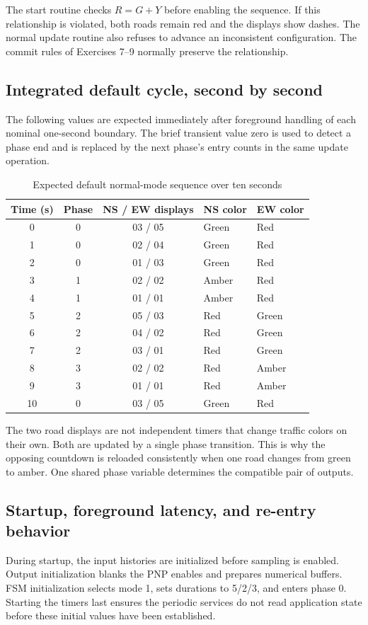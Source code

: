 \documentclass[a4paper]{article}
\newcommand{\topic}[1]{\subsection{#1}}
\begin{document}
The start routine checks \(R=G+Y\) before enabling the sequence. If this
relationship is violated, both roads remain red and the displays show dashes.
The normal update routine also refuses to advance an inconsistent configuration.
The commit rules of Exercises 7--9 normally preserve the relationship.

\topic{Integrated default cycle, second by second}

The following values are expected immediately after foreground handling of
each nominal one-second boundary. The brief transient value zero is used to
detect a phase end and is replaced by the next phase's entry counts in the
same update operation.
\begin{table}[htbp]\centering
\caption{Expected default normal-mode sequence over ten seconds}
\begin{tabular}{cccll}\toprule
Time (s) & Phase & NS / EW displays & NS color & EW color\\\midrule
0 & 0 & 03 / 05 & Green & Red\\
1 & 0 & 02 / 04 & Green & Red\\
2 & 0 & 01 / 03 & Green & Red\\
3 & 1 & 02 / 02 & Amber & Red\\
4 & 1 & 01 / 01 & Amber & Red\\
5 & 2 & 05 / 03 & Red & Green\\
6 & 2 & 04 / 02 & Red & Green\\
7 & 2 & 03 / 01 & Red & Green\\
8 & 3 & 02 / 02 & Red & Amber\\
9 & 3 & 01 / 01 & Red & Amber\\
10 & 0 & 03 / 05 & Green & Red\\\bottomrule
\end{tabular}\end{table}
The two road displays are not independent timers that change traffic colors
on their own. Both are updated by a single phase transition. This is why the
opposing countdown is reloaded consistently when one road changes from green
to amber. One shared phase variable determines the compatible pair of outputs.

\topic{Startup, foreground latency, and re-entry behavior}

During startup, the input histories are initialized before sampling is enabled.
Output initialization blanks the PNP enables and prepares numerical buffers.
FSM initialization selects mode 1, sets durations to 5/2/3, and enters phase 0.
Starting the timers last ensures the periodic services do not read application
state before these initial values have been established.
\end{document}
